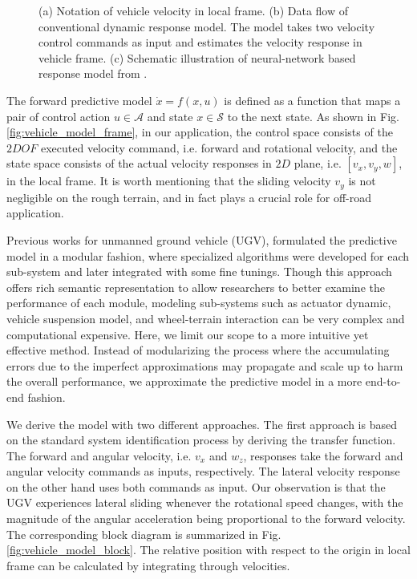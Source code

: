 \documentclass[../thesis.tex]{subfiles}
\begin{document}
\begin{figure}[t]
\begin{subfigure}[b]{0.8\linewidth}
		\subcaption{}
		\label{fig:vehicle_model_net}
	\end{subfigure}
	\caption{(a) Notation of vehicle velocity in local frame. (b) Data flow of conventional dynamic response model. The model takes two velocity control commands as input and estimates the velocity response in vehicle frame. (c) Schematic illustration of neural-network based response model from \cite{bode2007learning}.}
    \label{fig:vehicle_model}
\end{figure}


The forward predictive model $\dot{x}=f(x,u)$ is defined as a function that maps a pair of control action $u \in \mathcal{A}$ and state $x \in \mathcal{S}$ to the next state. As shown in Fig. \ref{fig:vehicle_model_frame}, in our application, the control space consists of the $2DOF$ executed velocity command, i.e. forward and rotational velocity, and the state space consists of the actual velocity responses in $2D$ plane, i.e. $[v_x, v_y, w]$, in the local frame. It is worth mentioning that the sliding velocity $v_y$ is not negligible on the rough terrain, and in fact plays a crucial role for off-road application.


Previous works \cite{kelly2007terrain,howard2006trajectory,howard2005terrain} for unmanned ground vehicle (UGV), formulated the predictive model in a modular fashion, where specialized algorithms were developed for each sub-system and later integrated with some fine tunings. Though this approach offers rich semantic representation to allow researchers to better examine the performance of each module, modeling sub-systems such as actuator dynamic, vehicle suspension model, and wheel-terrain interaction can be very complex and computational expensive. 
Here, we limit our scope to a more intuitive yet effective method. Instead of modularizing the process where the accumulating errors due to the imperfect approximations may propagate and scale up to harm the overall performance, we approximate the predictive model in a more end-to-end fashion. 

We derive the model with two different approaches. The first approach is based on the standard system identification process by deriving the transfer function. The forward and angular velocity, i.e. $v_x$ and $w_z$, responses take the forward and angular velocity commands as inputs, respectively. The lateral velocity response on the other hand uses both commands as input. Our observation is that the UGV experiences lateral sliding whenever the rotational speed changes, with the magnitude of the angular acceleration being proportional to the forward velocity. The corresponding block diagram is summarized in Fig. \ref{fig:vehicle_model_block}. The relative position with respect to the origin in local frame can be calculated by integrating through velocities.
\end{document}
